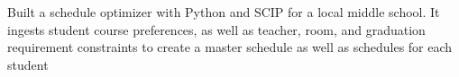 \documentclass[]{plushcv}
\begin{document}
\begin{minipage}[t]{0.70\textwidth}
\begin{tightemize}
\item Built a schedule optimizer with Python and SCIP for a local middle school. It ingests student course preferences, as well as teacher, room, and graduation requirement constraints to create a master schedule as well as schedules for each student \python\\

\end{tightemize}
\sectionsep



%
%

\end{minipage} 
\hfill
\end{document}
